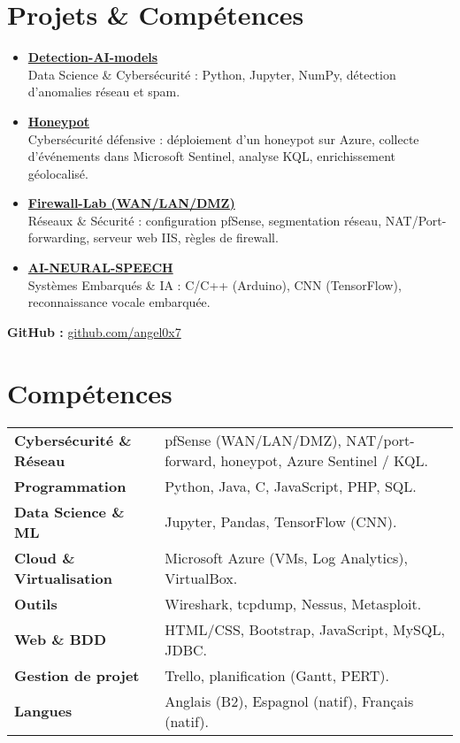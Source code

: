 \documentclass[a4paper,10pt]{article}
\begin{document}
\section*{Projets \& Compétences}

\begin{itemize}[leftmargin=*]
  \item \href{https://github.com/angel0x7/Detection-AI-models-}{\textbf{Detection-AI-models}} \\
  Data Science \& Cybersécurité : Python, Jupyter, NumPy, détection d’anomalies réseau et spam.

  \item \href{https://github.com/angel0x7/Honeypot-}{\textbf{Honeypot}} \\
  Cybersécurité défensive : déploiement d’un honeypot sur Azure, collecte d’événements dans Microsoft Sentinel, analyse KQL, enrichissement géolocalisé.

  \item \href{https://github.com/angel0x7/Firewall-Lab-WAN-LAN-DMZ-}{\textbf{Firewall-Lab (WAN/LAN/DMZ)}} \\
  Réseaux \& Sécurité : configuration pfSense, segmentation réseau, NAT/Port-forwarding, serveur web IIS, règles de firewall.

  \item \href{https://github.com/angel0x7/AI-NEURAL-SPEECH-}{\textbf{AI-NEURAL-SPEECH}} \\
  Systèmes Embarqués \& IA : C/C++ (Arduino), CNN (TensorFlow), reconnaissance vocale embarquée.


\end{itemize}

\noindent
\textbf{GitHub :} \href{https://github.com/angel0x7}{github.com/angel0x7}


\section*{Compétences}

\begin{tabular}{p{5cm} p{15cm}}
\textbf{Cybersécurité \& Réseau} & pfSense (WAN/LAN/DMZ), NAT/port-forward, honeypot, Azure Sentinel / KQL. \\
\textbf{Programmation} & Python, Java, C, JavaScript, PHP, SQL. \\
\textbf{Data Science \& ML} & Jupyter, Pandas, TensorFlow (CNN). \\
\textbf{Cloud \& Virtualisation} & Microsoft Azure (VMs, Log Analytics), VirtualBox. \\
\textbf{Outils} & Wireshark, tcpdump, Nessus, Metasploit. \\
\textbf{Web \& BDD} & HTML/CSS, Bootstrap, JavaScript, MySQL, JDBC. \\
\textbf{Gestion de projet} & Trello, planification (Gantt, PERT). \\
\textbf{Langues} & Anglais (B2), Espagnol (natif), Français (natif). \\
\end{tabular}
\end{document}
